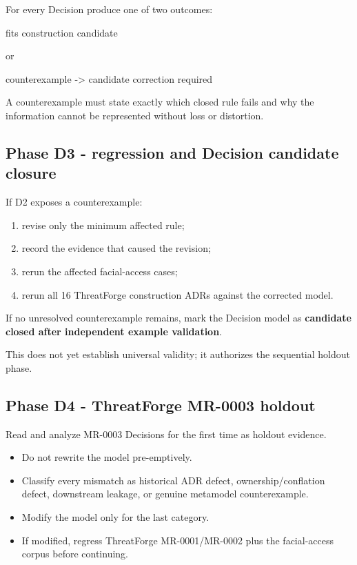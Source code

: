 \documentclass[
  10pt,
]{article}
\newenvironment{Shaded}{}{}
\newcommand{\NormalTok}[1]{#1}
\providecommand{\tightlist}{%
  \setlength{\itemsep}{0pt}\setlength{\parskip}{0pt}}
\begin{document}
For every Decision produce one of two outcomes:

\begin{Shaded}
\begin{Highlighting}[]
\NormalTok{fits construction candidate}

\NormalTok{or}

\NormalTok{counterexample {-}\textgreater{} candidate correction required}
\end{Highlighting}
\end{Shaded}

A counterexample must state exactly which closed rule fails and why the
information cannot be represented without loss or distortion.

\subsection{Phase D3 - regression and Decision candidate
closure}\label{phase-d3---regression-and-decision-candidate-closure}

If D2 exposes a counterexample:

\begin{enumerate}
\def\labelenumi{\arabic{enumi}.}
\tightlist
\item
  revise only the minimum affected rule;
\item
  record the evidence that caused the revision;
\item
  rerun the affected facial-access cases;
\item
  rerun all 16 ThreatForge construction ADRs against the corrected
  model.
\end{enumerate}

If no unresolved counterexample remains, mark the Decision model as
\textbf{candidate closed after independent example validation}.

This does not yet establish universal validity; it authorizes the
sequential holdout phase.

\subsection{Phase D4 - ThreatForge MR-0003
holdout}\label{phase-d4---threatforge-mr-0003-holdout}

Read and analyze MR-0003 Decisions for the first time as holdout
evidence.

\begin{itemize}
\tightlist
\item
  Do not rewrite the model pre-emptively.
\item
  Classify every mismatch as historical ADR defect, ownership/conflation
  defect, downstream leakage, or genuine metamodel counterexample.
\item
  Modify the model only for the last category.
\item
  If modified, regress ThreatForge MR-0001/MR-0002 plus the
  facial-access corpus before continuing.
\end{itemize}
\end{document}
